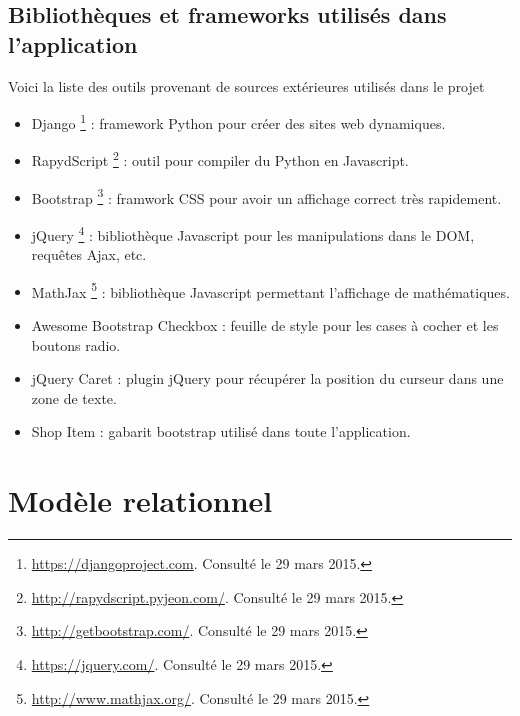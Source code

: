\documentclass[a4,10pt,french]{sphinxmanual}
\begin{document}
\section{Bibliothèques et frameworks utilisés dans l'application}
\label{global:bibliotheques-et-frameworks-utilises-dans-l-application}
Voici la liste des outils provenant de sources extérieures utilisés dans le projet
\begin{itemize}
\item {} 
Django \footnote{
\href{https://djangoproject.com}{https://djangoproject.com}. Consulté le 29 mars 2015.
} : framework Python pour créer des sites web dynamiques.

\item {} 
RapydScript \footnote{
\href{http://rapydscript.pyjeon.com/}{http://rapydscript.pyjeon.com/}. Consulté le 29 mars 2015.
} : outil pour compiler du Python en Javascript.

\item {} 
Bootstrap \footnote{
\href{http://getbootstrap.com/}{http://getbootstrap.com/}. Consulté le 29 mars 2015.
} : framwork CSS pour avoir un affichage correct très rapidement.

\item {} 
jQuery \footnote{
\href{https://jquery.com/}{https://jquery.com/}. Consulté le 29 mars 2015.
} : bibliothèque Javascript pour les manipulations dans le DOM, requêtes Ajax, etc.

\item {} 
MathJax \footnote{
\href{http://www.mathjax.org/}{http://www.mathjax.org/}. Consulté le 29 mars 2015.
} : bibliothèque Javascript permettant l'affichage de mathématiques.

\item {} 
Awesome Bootstrap Checkbox \footnotemark[9] : feuille de style pour les cases à cocher et les boutons radio.

\item {} 
jQuery Caret \footnotemark[11] : plugin jQuery pour récupérer la position du curseur dans une zone de texte.

\item {} 
Shop Item \footnotemark[10] : gabarit bootstrap utilisé dans toute l'application.

\end{itemize}


\chapter{Modèle relationnel}
\label{database::doc}\label{database:modele-relationnel}
\end{document}
